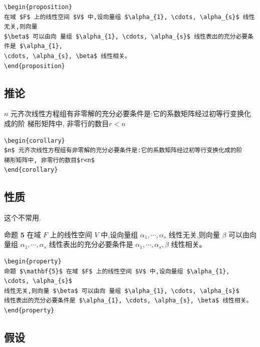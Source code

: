 \documentclass[../book.tex]{subfiles}
\begin{document}
\begin{lstlisting}
\begin{proposition}
在域 $F$ 上的线性空间 $V$ 中,设向量组 $\alpha_{1}, \cdots, \alpha_{s}$ 线性无关,则向量
$\beta$ 可以由向 量组 $\alpha_{1}, \cdots, \alpha_{s}$ 线性表出的充分必要条件是 $\alpha_{1},
\cdots, \alpha_{s}, \beta$ 线性相关。
\end{proposition}
\end{lstlisting}

    \subsection{推论}

\begin{corollary}
$n$ 元齐次线性方程组有非零解的充分必要条件是:它的系数矩阵经过初等行变换化成的阶
梯形矩阵中, 非零行的数目$r<n$
\end{corollary}

\begin{lstlisting}
\begin{corollary}
$n$ 元齐次线性方程组有非零解的充分必要条件是:它的系数矩阵经过初等行变换化成的阶
梯形矩阵中, 非零行的数目$r<n$
\end{corollary}
\end{lstlisting}

    \subsection{性质}

这个不常用.
    
\begin{property}
命题 $\mathbf{5}$ 在域 $F$ 上的线性空间 $V$ 中,设向量组 $\alpha_{1}, \cdots, \alpha_{s}$
线性无关,则向量 $\beta$ 可以由向 量组 $\alpha_{1}, \cdots, \alpha_{s}$
线性表出的充分必要条件是 $\alpha_{1}, \cdots, \alpha_{s}, \beta$ 线性相关。
\end{property}

\begin{lstlisting}
\begin{property}
命题 $\mathbf{5}$ 在域 $F$ 上的线性空间 $V$ 中,设向量组 $\alpha_{1}, \cdots, \alpha_{s}$
线性无关,则向量 $\beta$ 可以由向 量组 $\alpha_{1}, \cdots, \alpha_{s}$
线性表出的充分必要条件是 $\alpha_{1}, \cdots, \alpha_{s}, \beta$ 线性相关。
\end{property}
\end{lstlisting}

    \subsection{假设}
\end{document}
